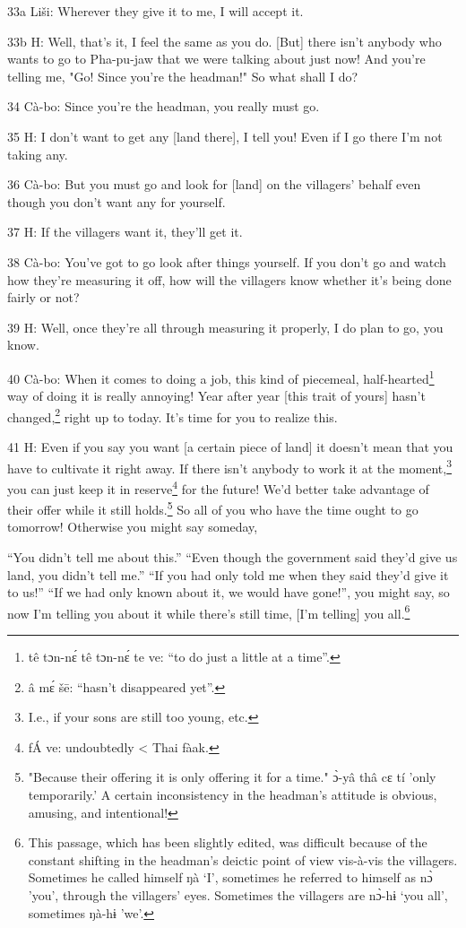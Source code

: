 33a Liši: Wherever they give it to me, I will accept it.

33b H: Well, that's it, I feel the same as you do. [But] there isn't anybody who
wants to go to Pha-pu-jaw that we were talking about just now! And you're telling
me, "Go! Since you're the headman!" So what shall I do?

34 Cà-bo: Since you're the headman, you really must go.

35 H: I don't want to get any [land there], I tell you! Even if I go there I'm
not taking any.

36 Cà-bo: But you must go and look for [land] on the villagers' behalf even though
you don't want any for yourself.

37 H: If the villagers want it, they'll get it.

38 Cà-bo: You've got to go look after things yourself. If you don't go and watch
how they're measuring it off, how will the villagers know whether it's being done
fairly or not?

39 H: Well, once they're all through measuring it properly, I do plan to go, you
know.

40 Cà-bo: When it comes to doing a job, this kind of piecemeal, half-hearted\footnote{tê tɔn-nɛ́ tê tɔn-nɛ́ te ve: ``to do just a little at a time''.}
way of doing it is really annoying! Year after year [this trait of yours] hasn't
changed,\footnote{â mɛ́ šē: ``hasn't disappeared yet''.} right up to today. It's time for you to realize this.

41 H: Even if you say you want [a certain piece of land] it doesn't mean that you
have to cultivate it right away. If there isn't anybody to work it at the moment,\footnote{I.e., if your sons are still too young, etc.}
you can just keep it in reserve\footnote{fÁ ve: undoubtedly < Thai fàak.} for the future! We'd better take advantage
of their offer while it still holds.\footnote{"Because their offering it is only offering it for a time." ɔ̀-yâ thâ cɛ tí 'only temporarily.' A certain inconsistency in the headman's attitude is obvious, amusing, and intentional!} So all of you who have the time ought
to go tomorrow! Otherwise you might say someday,

``You didn't tell me about this.'' ``Even though the government said they'd give
us land, you didn't tell me.'' ``If you had only told me when they said they'd
give it to us!'' ``If we had only known about it, we would have gone!'', you might
say, so now I'm telling you about it while there's still time, [I'm telling] you
all.\footnote{This passage, which has been slightly edited, was difficult because of the constant shifting in the headman's deictic point of view vis-à-vis the villagers. Sometimes he called himself ŋà `I', sometimes he referred to himself as nɔ̀ 'you', through the villagers' eyes. Sometimes the villagers are nɔ̀-hɨ `you all', sometimes ŋà-hɨ 'we'.}

